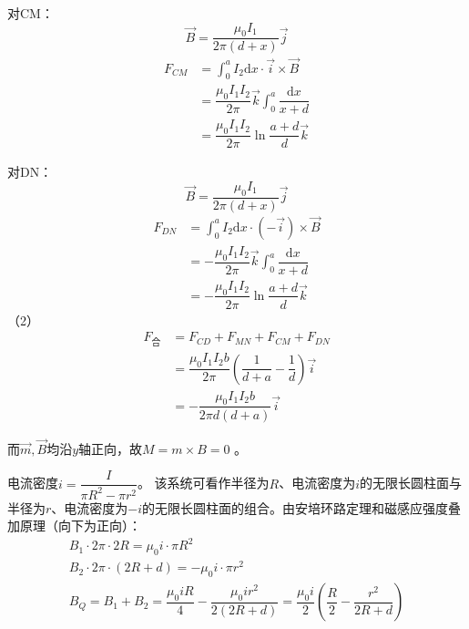 \documentclass[b5paper,opensource,sourcefont,parskip]{qyxf-book}
\newcommand{\di}[1]{\mathrm{d}#1}
\begin{document}
对CM：
\[
\vec{B}=\dfrac{\mu_0I_1}{2\pi (d+x)}\vec{j}
\]
\begin{align*}
F_{CM}&=\int_{0}^{a}I_2\di{x}\cdot\vec{i}\times \vec{B}\\
&=\dfrac{\mu_0I_1I_2}{2\pi}\vec{k}\int_{0}^{a}\dfrac{\di{x}}{x+d}\\
&=\dfrac{\mu_0I_1I_2}{2\pi}\ln\dfrac{a+d}{d}\vec{k}
\end{align*}

对DN：
\[
\vec{B}=\dfrac{\mu_0I_1}{2\pi (d+x)}\vec{j}
\]
\begin{align*}
F_{DN}&=\int_{0}^{a}I_2\di{x}\cdot(-\vec{i})\times \vec{B}\\
&=-\dfrac{\mu_0I_1I_2}{2\pi}\vec{k}\int_{0}^{a}\dfrac{\di{x}}{x+d}\\
&=-\dfrac{\mu_0I_1I_2}{2\pi}\ln\dfrac{a+d}{d}\vec{k}
\end{align*}
（2）
\begin{align*}
F_\text{合}&=F_{CD}+F_{MN}+F_{CM}+F_{DN}\\
&=\dfrac{\mu_0I_1I_2b}{2\pi}(\dfrac{1}{d+a}-\dfrac{1}{d})\vec{i}\\
&=-\dfrac{\mu_0I_1I_2b}{2\pi d(d+a)}\vec{i}
\end{align*}

而$\vec{m},\vec{B}$均沿$y$轴正向，故$M=m\times B=0$
\footnotemark[5]。


\solve
电流密度$i=\dfrac{I}{\pi R^2-\pi r^2}$。
该系统可看作半径为$R$、电流密度为$i$的无限长圆柱面与半径为$r$、电流密度为$-i$的无限长圆柱面的组合。由安培环路定理和磁感应强度叠加原理（向下为正向）：
\begin{gather*}
B_1\cdot 2\pi\cdot 2R=\mu_0i\cdot\pi R^2\\
B_2\cdot 2\pi\cdot (2R+d)=-\mu_0i\cdot\pi r^2\\
B_Q=B_1+B_2=\dfrac{\mu_0iR}{4}-\dfrac{\mu_0ir^2}{2(2R+d)}=\dfrac{\mu_0i}{2}(\dfrac{R}{2}-\dfrac{r^2}{2R+d})
\end{gather*}
\end{document}
